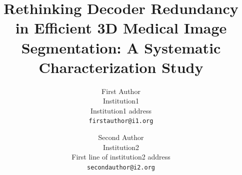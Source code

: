\documentclass[10pt,twocolumn,letterpaper]{article}
\title{Rethinking Decoder Redundancy in Efficient 3D Medical Image Segmentation: A Systematic Characterization Study}
\author{First Author\\
Institution1\\
Institution1 address\\
{\tt\small firstauthor@i1.org}
\and
Second Author\\
Institution2\\
First line of institution2 address\\
{\tt\small secondauthor@i2.org}
}
\begin{document}
\maketitle




{
    \small
    
    
}
\end{document}
